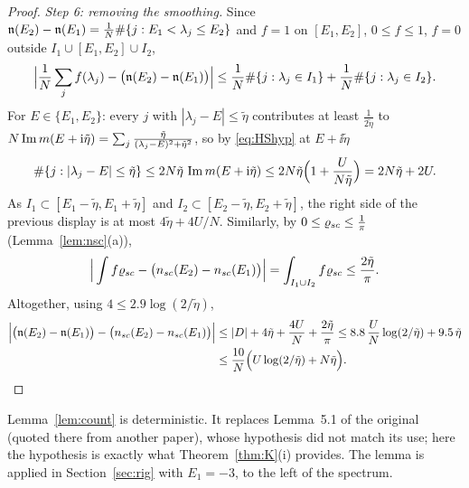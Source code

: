 \begin{proof}
\emph{Step 6: removing the smoothing.} Since $\mathfrak{n}(E_2)-\mathfrak{n}(E_1)=\frac1N\#\{j:E_1<\lambda_j\le E_2\}$ and $f=1$ on $[E_1,E_2]$, $0\le f\le1$, $f=0$ outside $I_1\cup[E_1,E_2]\cup I_2$,
\[
 \Big|\frac1N\sum_jf(\lambda_j)-\big(\mathfrak{n}(E_2)-\mathfrak{n}(E_1)\big)\Big|\le\frac1N\#\{j:\lambda_j\in I_1\}+\frac1N\#\{j:\lambda_j\in I_2\}.
\]
For $E\in\{E_1,E_2\}$: every $j$ with $|\lambda_j-E|\le\tilde\eta$ contributes at least $\frac1{2\tilde\eta}$ to $N\operatorname{Im} m(E+\mathrm{i}\tilde\eta)=\sum_j\frac{\tilde\eta}{(\lambda_j-E)^2+\tilde\eta^2}$, so by \eqref{eq:HShyp} at $E+\ii\tilde\eta$
\[
 \#\{j:|\lambda_j-E|\le\tilde\eta\}\le2N\tilde\eta\,\operatorname{Im} m(E+\mathrm{i}\tilde\eta)\le2N\tilde\eta\Big(1+\frac{U}{N\tilde\eta}\Big)=2N\tilde\eta+2U .
\]
As $I_1\subset[E_1-\tilde\eta,E_1+\tilde\eta]$ and $I_2\subset[E_2-\tilde\eta,E_2+\tilde\eta]$, the right side of the previous display is at most $4\tilde\eta+4U/N$.
Similarly, by $0\le\varrho_{sc}\le\frac1\pi$ (Lemma~\ref{lem:nsc}(a)),
\[
 \Big|\int f\varrho_{sc}-\big(n_{sc}(E_2)-n_{sc}(E_1)\big)\Big|=\int_{I_1\cup I_2}f\varrho_{sc}\le\frac{2\tilde\eta}\pi .
\]
Altogether, using $4\le2.9\log(2/\tilde\eta)$,
\begin{align*}
 \Big|\big(\mathfrak{n}(E_2)-\mathfrak{n}(E_1)\big)-\big(n_{sc}(E_2)-n_{sc}(E_1)\big)\Big|&\le|D|+4\tilde\eta+\frac{4U}N+\frac{2\tilde\eta}\pi\le8.8\,\frac UN\log(2/\tilde\eta)+9.5\,\tilde\eta\\
 &\le\frac{10}N\Big(U\log(2/\tilde\eta)+N\tilde\eta\Big).\qedhere
\end{align*}
\end{proof}
\begin{remark}\label{rem:count}
Lemma~\ref{lem:count} is deterministic. It replaces Lemma~5.1 of the original (quoted there from another paper), whose hypothesis did not match its use; here the hypothesis is exactly what Theorem~\ref{thm:K}(i) provides.
The lemma is applied in Section~\ref{sec:rig} with $E_1=-3$, to the left of the spectrum.
\end{remark}
